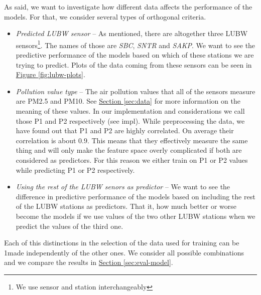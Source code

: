 \documentclass[12pt,a4paper,twoside]{scrartcl}
\numberwithin{equation}{section}
\newcommand{\reffig}[1]{\hyperref[#1]{Figure \ref*{#1}}}
\newcommand{\refsec}[1]{\hyperref[#1]{Section \ref*{#1}}}
\begin{document}
As said, we want to investigate how different data affects the performance of the models. For that, we consider several types of orthogonal criteria.
\begin{itemize}
\item \emph{Predicted LUBW sensor} -- As mentioned, there are altogether three LUBW sensors\footnote{We use sensor and station interchangeably}. The names of those are \emph{SBC}, \emph{SNTR} and \emph{SAKP}. We want to see the predictive performance of the models based on which of these stations we are trying to predict. Plots of the data coming from these sensors can be seen in \reffig{fig:lubw-plots}.
\item \emph{Pollution value type} -- The air pollution values that all of the sensors measure are PM2.5 and PM10. See \refsec{sec:data} for more information on the meaning of these values. In our implementation and considerations we call those P1 and P2 respectively (see impl). While preprocessing the data, we have found out that P1 and P2 are highly correlated. On average their correlation is about \(0.9 \). This means that they effectively measure the same thing and will only make the feature space overly complicated if both are considered as predictors. For this reason we either train on P1 or P2 values while predicting P1 or P2 respectively.
\item \emph{Using the rest of the LUBW senors as predictor} -- We want to see the difference in predictive performance of the models based on including the rest of the LUBW stations as predictors. That it, how much better or worse become the models if we use values of the two other LUBW stations when we predict the values of the third one.
\end{itemize}
Each of this distinctions in the selection of the data used for training can be 1made independently of the other ones. We consider all possible combinations and we compare the results in \refsec{sec:eval-model}.
\end{document}
